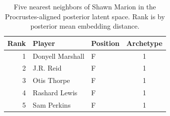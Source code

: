 \begin{table}[htbp]
  \centering\small
  \begin{tabular}{rllc}
    \toprule
    Rank & Player & Position & Archetype \\
    \midrule
    1 & Donyell Marshall & F & 1 \\
    2 & J.R. Reid & F & 1 \\
    3 & Otis Thorpe & F & 1 \\
    4 & Rashard Lewis & F & 1 \\
    5 & Sam Perkins & F & 1 \\
    \bottomrule
  \end{tabular}
  \caption{Five nearest neighbors of Shawn Marion in the Procrustes-aligned posterior latent space. Rank is by posterior mean embedding distance.}
  \label{tab:Shawn_Marion_neighbors}
\end{table}

